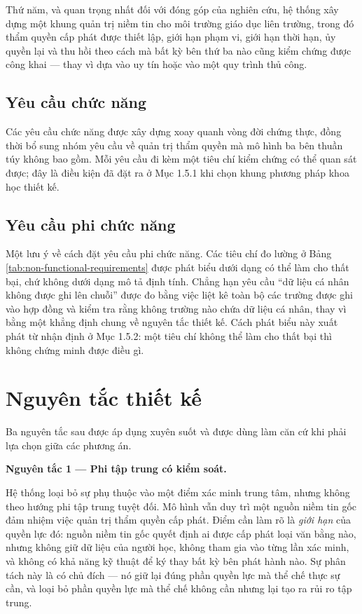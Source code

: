 Thứ năm, và quan trọng nhất đối với đóng góp của nghiên cứu, hệ thống xây dựng một khung quản trị niềm tin cho môi trường giáo dục liên trường, trong đó thẩm quyền cấp phát được thiết lập, giới hạn phạm vi, giới hạn thời hạn, ủy quyền lại và thu hồi theo cách mà bất kỳ bên thứ ba nào cũng kiểm chứng được công khai --- thay vì dựa vào uy tín hoặc vào một quy trình thủ công.

\subsection{Yêu cầu chức năng}

Các yêu cầu chức năng được xây dựng xoay quanh vòng đời chứng thực, đồng thời bổ sung nhóm yêu cầu về quản trị thẩm quyền mà mô hình ba bên thuần túy không bao gồm. Mỗi yêu cầu đi kèm một tiêu chí kiểm chứng có thể quan sát được; đây là điều kiện đã đặt ra ở Mục 1.5.1 khi chọn khung phương pháp khoa học thiết kế.



\subsection{Yêu cầu phi chức năng}



Một lưu ý về cách đặt yêu cầu phi chức năng. Các tiêu chí đo lường ở Bảng \ref{tab:non-functional-requirements} được phát biểu dưới dạng có thể làm cho thất bại, chứ không dưới dạng mô tả định tính. Chẳng hạn yêu cầu {``}dữ liệu cá nhân không được ghi lên chuỗi{''} được đo bằng việc liệt kê toàn bộ các trường được ghi vào hợp đồng và kiểm tra rằng không trường nào chứa dữ liệu cá nhân, thay vì bằng một khẳng định chung về nguyên tắc thiết kế. Cách phát biểu này xuất phát từ nhận định ở Mục 1.5.2: một tiêu chí không thể làm cho thất bại thì không chứng minh được điều gì.

\section{Nguyên tắc thiết kế}

Ba nguyên tắc sau được áp dụng xuyên suốt và được dùng làm căn cứ khi phải lựa chọn giữa các phương án.

\noindent \textbf{Nguyên tắc 1 --- Phi tập trung có kiểm soát.}

Hệ thống loại bỏ sự phụ thuộc vào một điểm xác minh trung tâm, nhưng không theo hướng phi tập trung tuyệt đối. Mô hình vẫn duy trì một nguồn niềm tin gốc đảm nhiệm việc quản trị thẩm quyền cấp phát. Điểm cần làm rõ là \emph{giới hạn} của quyền lực đó: nguồn niềm tin gốc quyết định ai được cấp phát loại văn bằng nào, nhưng không giữ dữ liệu của người học, không tham gia vào từng lần xác minh, và không có khả năng kỹ thuật để ký thay bất kỳ bên phát hành nào. Sự phân tách này là có chủ đích --- nó giữ lại đúng phần quyền lực mà thể chế thực sự cần, và loại bỏ phần quyền lực mà thể chế không cần nhưng lại tạo ra rủi ro tập trung.

